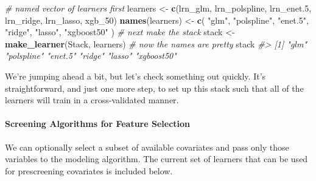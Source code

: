 \documentclass[12pt, krantz2,]{krantz}
\newenvironment{Shaded}{\begin{snugshade}}{\end{snugshade}}
\newcommand{\CommentTok}[1]{\textcolor[rgb]{0.37,0.37,0.37}{\textit{#1}}}
\newcommand{\DecValTok}[1]{\textcolor[rgb]{0.06,0.06,0.06}{#1}}
\newcommand{\FloatTok}[1]{\textcolor[rgb]{0.06,0.06,0.06}{#1}}
\newcommand{\KeywordTok}[1]{\textcolor[rgb]{0.27,0.27,0.27}{\textbf{#1}}}
\newcommand{\NormalTok}[1]{#1}
\newcommand{\OperatorTok}[1]{\textcolor[rgb]{0.43,0.43,0.43}{\textbf{#1}}}
\newcommand{\StringTok}[1]{\textcolor[rgb]{0.5,0.5,0.5}{#1}}
\let\oldparagraph\paragraph
\renewcommand{\paragraph}[1]{\oldparagraph{#1}\mbox{}}
\theoremstyle{definition}
\theoremstyle{definition}
\theoremstyle{definition}
\newcommand{\1}{\mathbbm{1}}
\begin{document}
\begin{Shaded}
\begin{Highlighting}[]
\CommentTok{# named vector of learners first}
\NormalTok{learners <-}\StringTok{ }\KeywordTok{c}\NormalTok{(lrn_glm, lrn_polspline, lrn_enet}\FloatTok{.5}\NormalTok{, lrn_ridge, lrn_lasso, xgb_}\DecValTok{50}\NormalTok{)}
\KeywordTok{names}\NormalTok{(learners) <-}\StringTok{ }\KeywordTok{c}\NormalTok{(}
  \StringTok{"glm"}\NormalTok{, }\StringTok{"polspline"}\NormalTok{, }\StringTok{"enet.5"}\NormalTok{, }\StringTok{"ridge"}\NormalTok{, }\StringTok{"lasso"}\NormalTok{, }\StringTok{"xgboost50"}
\NormalTok{)}
\CommentTok{# next make the stack}
\NormalTok{stack <-}\StringTok{ }\KeywordTok{make_learner}\NormalTok{(Stack, learners)}
\CommentTok{# now the names are pretty}
\NormalTok{stack}
\CommentTok{#> [1] "glm"       "polspline" "enet.5"    "ridge"     "lasso"     "xgboost50"}
\end{Highlighting}
\end{Shaded}

We're jumping ahead a bit, but let's check something out quickly. It's
straightforward, and just one more step, to set up this stack such that all of
the learners will train in a cross-validated manner.

\begin{Shaded}
\end{Shaded}

\hypertarget{screening-algorithms-for-feature-selection}{%
\paragraph{Screening Algorithms for Feature Selection}\label{screening-algorithms-for-feature-selection}}

We can optionally select a subset of available covariates and pass only those
variables to the modeling algorithm. The current set of learners that can be
used for prescreening covariates is included below.
\end{document}
